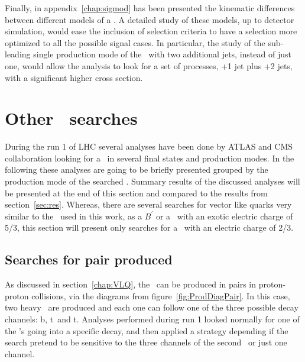 Finally, in appendix~\ref{chap:sigmod} has been presented the kinematic differences between different models of a \Tp. A detailed study of these models, up to detector simulation, would ease the inclusion of selection criteria to have a selection more optimized to all the possible signal cases. In particular, the study of the sub-leading single production mode of the \Tp~with two additional jets, instead of just one, would allow the analysis to look for a set of processes, \Tp+1 jet plus \Tp+2 jets, with a significant higher cross section. 

\section{Other \Tp~searches}
\label{sec:art}

During the run 1 of LHC several analyses have been done by ATLAS and CMS collaboration looking for a \Tp~in several final states and production modes. In the following these analyses are going to be briefly presented grouped by the production mode of the searched \Tp. Summary results of the discussed analyses will be presented at the end of this section and compared to the results from section~\ref{sec:res}. Whereas, there are several searches for vector like quarks very similar to the \Tp~used in this work, as a $B^{'}$ or a \Tp~with an exotic electric charge of 5/3, this section will present only searches for a \Tp~with an electric charge of 2/3.

\subsection{Searches for pair produced \Tp}
\label{sec:pairanal}

As discussed in section~\ref{chap:VLQ}, the \Tp~can be produced in pairs in proton-proton collisions, via the diagrams from figure~\ref{fig:ProdDiagPair}. In this case, two heavy \Tp~are produced and each one can follow one of the three possible decay channels: b\W, t\Z~and t\Hb. Analyses performed during run 1 looked normally for one of the \Tp's going into a specific decay, and then applied a strategy depending if the search pretend to be sensitive to the three channels of the second \Tp~or just one channel. 

